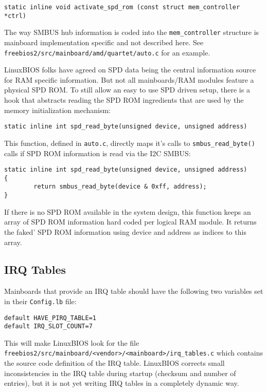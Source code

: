 \documentclass[titlepage,12pt]{article}
\begin{document}
\begin{verbatim}
static inline void activate_spd_rom (const struct mem_controller *ctrl)
\end{verbatim}

The way SMBUS hub information is coded into the \texttt{mem\_controller}
structure is mainboard implementation specific and not
described here.  See \texttt{freebios2/src/mainboard/amd/quartet/auto.c}
for an example.

LinuxBIOS folks have agreed on SPD data being the central information
source for RAM specific information. But not all mainboards/RAM
modules feature a physical SPD ROM. To still allow an easy to use SPD
driven setup, there is a hook that abstracts reading the SPD ROM
ingredients that are used by the memory initialization mechanism:

\begin{verbatim}
static inline int spd_read_byte(unsigned device, unsigned address)
\end{verbatim}

This function, defined in \texttt{auto.c}, directly maps it's calls to
\texttt{smbus\_read\_byte()} calls if SPD ROM information is read via
the I2C SMBUS:

\begin{verbatim}
static inline int spd_read_byte(unsigned device, unsigned address)
{
        return smbus_read_byte(device & 0xff, address);
}
\end{verbatim}

If there is no SPD ROM available in the system design, this function
keeps an array of SPD ROM information hard coded per logical RAM module.
It returns the faked' SPD ROM information using device and address
as indices to this array.


\subsection {IRQ Tables}

Mainboards that provide an IRQ table should have the following two
variables set in their \texttt{Config.lb} file:

\begin{verbatim}
default HAVE_PIRQ_TABLE=1
default IRQ_SLOT_COUNT=7
\end{verbatim}

This will make LinuxBIOS look for the file \\
\texttt{freebios2/src/mainboard/<vendor>/<mainboard>/irq\_tables.c} which
contains the source code definition of the IRQ table. LinuxBIOS corrects
small inconsistencies in the IRQ table during startup (checksum and
number of entries), but it is not yet writing IRQ tables in a completely 
dynamic way.
\end{document}
